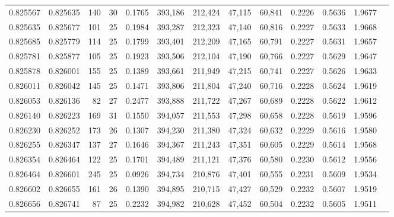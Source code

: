 \begin{tabular}{rrrrrrrrrrrrr}
0.825567 & 0.825635 &   140 &  30 &                                     0.1765 & 393,186 & 212,424 &  47,115 &  60,841 & 0.2226 & 0.5636 & 1.9677 \\
0.825635 & 0.825677 &   101 &  25 &                                     0.1984 & 393,287 & 212,323 &  47,140 &  60,816 & 0.2227 & 0.5633 & 1.9668 \\
0.825685 & 0.825779 &   114 &  25 &                                     0.1799 & 393,401 & 212,209 &  47,165 &  60,791 & 0.2227 & 0.5631 & 1.9657 \\
0.825781 & 0.825877 &   105 &  25 &                                     0.1923 & 393,506 & 212,104 &  47,190 &  60,766 & 0.2227 & 0.5629 & 1.9647 \\
0.825878 & 0.826001 &   155 &  25 &                                     0.1389 & 393,661 & 211,949 &  47,215 &  60,741 & 0.2227 & 0.5626 & 1.9633 \\
0.826011 & 0.826042 &   145 &  25 &                                     0.1471 & 393,806 & 211,804 &  47,240 &  60,716 & 0.2228 & 0.5624 & 1.9619 \\
0.826053 & 0.826136 &    82 &  27 &                                     0.2477 & 393,888 & 211,722 &  47,267 &  60,689 & 0.2228 & 0.5622 & 1.9612 \\
0.826140 & 0.826223 &   169 &  31 &                                     0.1550 & 394,057 & 211,553 &  47,298 &  60,658 & 0.2228 & 0.5619 & 1.9596 \\
0.826230 & 0.826252 &   173 &  26 &                                     0.1307 & 394,230 & 211,380 &  47,324 &  60,632 & 0.2229 & 0.5616 & 1.9580 \\
0.826255 & 0.826347 &   137 &  27 &                                     0.1646 & 394,367 & 211,243 &  47,351 &  60,605 & 0.2229 & 0.5614 & 1.9568 \\
0.826354 & 0.826464 &   122 &  25 &                                     0.1701 & 394,489 & 211,121 &  47,376 &  60,580 & 0.2230 & 0.5612 & 1.9556 \\
0.826464 & 0.826601 &   245 &  25 &                                     0.0926 & 394,734 & 210,876 &  47,401 &  60,555 & 0.2231 & 0.5609 & 1.9534 \\
0.826602 & 0.826655 &   161 &  26 &                                     0.1390 & 394,895 & 210,715 &  47,427 &  60,529 & 0.2232 & 0.5607 & 1.9519 \\
0.826656 & 0.826741 &    87 &  25 &                                     0.2232 & 394,982 & 210,628 &  47,452 &  60,504 & 0.2232 & 0.5605 & 1.9511 \\

\end{tabular}
